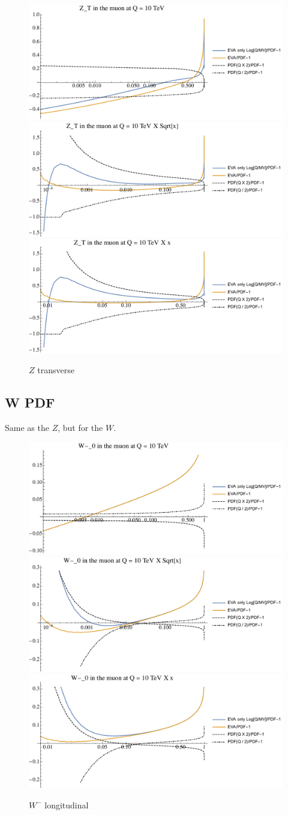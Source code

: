 \documentclass[a4paper,11pt]{article}
\begin{document}
\begin{figure}[!b]
\includegraphics[width=0.46\linewidth]{Notebooks/PlotPDFs/ratios/10TeV/Z_T_Q.pdf}
\includegraphics[width=0.46\linewidth]{Notebooks/PlotPDFs/ratios/10TeV/Z_T_Qsqrtx.pdf}
\includegraphics[width=0.46\linewidth]{Notebooks/PlotPDFs/ratios/10TeV/Z_T_Qx.pdf}
\caption{$Z$ transverse}
\end{figure}


\clearpage



\subsection{W PDF}
\label{app:PDFsEVA_W}

Same as the $Z$, but for the $W$.


\begin{figure}[!b]
\includegraphics[width=0.46\linewidth]{Notebooks/PlotPDFs/ratios/10TeV/W-_0_Q.pdf}
\includegraphics[width=0.46\linewidth]{Notebooks/PlotPDFs/ratios/10TeV/W-_0_Qsqrtx.pdf}
\includegraphics[width=0.46\linewidth]{Notebooks/PlotPDFs/ratios/10TeV/W-_0_Qx.pdf}
\caption{$W^-$ longitudinal}
\end{figure}
\end{document}
